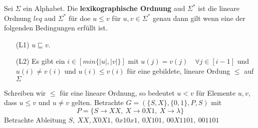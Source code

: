     Sei \(\Sigma \) ein Alphabet. Die \textbf{lexikographische Ordnung} aud \(\Sigma^*\) ist die lineare Ordnung \(leq\) aud \(\Sigma^*\) für doe \(u \leq v\) für \(u, v \in \Sigma^*\) genau dann gilt wenn eine der folgenden Bedingungen erfüllt ist.
    \begin{itemize}
        \item [(L1)] \( u \sqsubseteq v\).
        \item [(L2)] Es gibt ein \(i \in [min \{|u|, |v|\}] \) mit \( u(j) = v (j) \quad \forall j \in [i - 1]\) und \(u (i) \not = v (i)\) und \(u (i) \leq v(i)\) für eine gebildete, lineare Ordung \(\leq\) auf \(\Sigma\)
    \end{itemize}
    Schreiben wir \(\leq\) für eine lineare Ordnung, so bedeutet \(u < v\) für Elemente \(u, v\), dass \(u \leq v\) und \(u \not = v\) gelten.
    \newpage
    Betrachte \(G = (\{S, X\}, \{0, 1\}, P, S)\) mit \[P = \{S \to XX,\ X \to 0X1,\ X \to \lambda\}\] 
    Betrachte Ableitung \(S,\ XX, X0X1,\ 0x10x1,\ 0X101,\ 00X1101,\ 001101\)
    \vspace{1cm}
    \createDiagram{}
    {
    }
